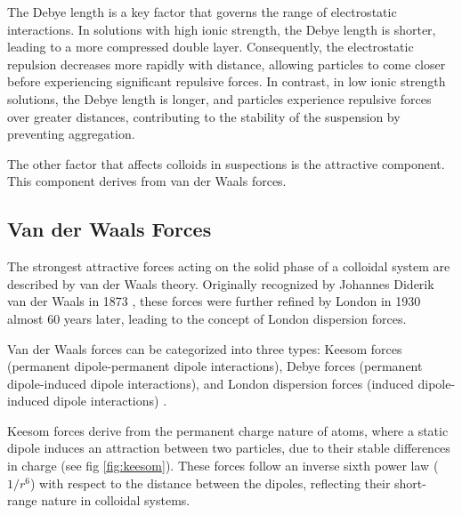 The Debye length is a key factor that governs the range of electrostatic interactions. In solutions with high ionic strength, the Debye length is shorter, leading to a more compressed double layer. Consequently, the electrostatic repulsion decreases more rapidly with distance, allowing particles to come closer before experiencing significant repulsive forces. In contrast, in low ionic strength solutions, the Debye length is longer, and particles experience repulsive forces over greater distances, contributing to the stability of the suspension by preventing aggregation.

The other factor that affects colloids in suspections is the attractive component. This component derives from van der Waals forces.





\subsection{Van der Waals Forces}


The strongest attractive forces acting on the solid phase of a colloidal system are described by van der Waals theory. Originally recognized by Johannes Diderik van der Waals in 1873 \cite{vanderWaals}, these forces were further refined by London in 1930 \cite{London} almost 60 years later, leading to the concept of London dispersion forces. 

Van der Waals forces can be categorized into three types: Keesom forces (permanent dipole-permanent dipole interactions), Debye forces (permanent dipole-induced dipole interactions), and London dispersion forces (induced dipole-induced dipole interactions) \cite{sciDirBook}. 

Keesom forces derive from the permanent charge nature of atoms, where a static dipole induces an attraction between two particles, due to their stable differences in charge (see fig \ref{fig:keesom}). These forces follow an inverse sixth power law (\(1/r^6\)) with respect to the distance between the dipoles, reflecting their short-range nature in colloidal systems.

